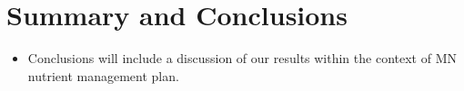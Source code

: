 \documentclass[12pt,]{article}
\providecommand{\tightlist}{%
  \setlength{\itemsep}{0pt}\setlength{\parskip}{0pt}}
\begin{document}
\newpage

\hypertarget{summary-and-conclusions}{%
\section{Summary and Conclusions}\label{summary-and-conclusions}}

\begin{itemize}
\tightlist
\item
  Conclusions will include a discussion of our results within the
  context of MN nutrient management plan.
\end{itemize}
\end{document}
